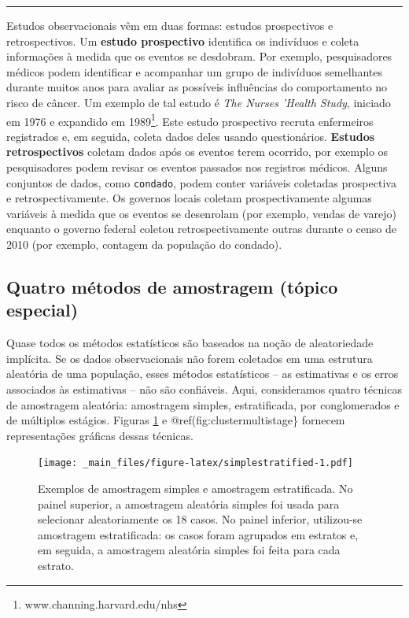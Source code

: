 \documentclass[
]{book}
\theoremstyle{definition}
\theoremstyle{definition}
\theoremstyle{definition}
\theoremstyle{definition}
\theoremstyle{remark}
\begin{document}
\begin{center}\rule{0.5\linewidth}{0.5pt}\end{center}

Estudos observacionais vêm em duas formas: estudos prospectivos e retrospectivos. Um \textbf{estudo prospectivo} identifica os indivíduos e coleta informações à medida que os eventos se desdobram. Por exemplo, pesquisadores médicos podem identificar e acompanhar um grupo de indivíduos semelhantes durante muitos anos para avaliar as possíveis influências do comportamento no risco de câncer. Um exemplo de tal estudo é \emph{The Nurses 'Health Study}, iniciado em 1976 e expandido em 1989\footnote{www.channing.harvard.edu/nhs}. Este estudo prospectivo recruta enfermeiros registrados e, em seguida, coleta dados deles usando questionários. \textbf{Estudos retrospectivos} coletam dados após os eventos terem ocorrido, por exemplo os pesquisadores podem revisar os eventos passados nos registros médicos. Alguns conjuntos de dados, como \texttt{condado}, podem conter variáveis coletadas prospectiva e retrospectivamente. Os governos locais coletam prospectivamente algumas variáveis à medida que os eventos se desenrolam (por exemplo, vendas de varejo) enquanto o governo federal coletou retrospectivamente outras durante o censo de 2010 (por exemplo, contagem da população do condado).

\hypertarget{fourSamplingMethods}{%
\subsection{Quatro métodos de amostragem (tópico especial)}\label{fourSamplingMethods}}

Quase todos os métodos estatísticos são baseados na noção de aleatoriedade implícita. Se os dados observacionais não forem coletados em uma estrutura aleatória de uma população, esses métodos estatísticos -- as estimativas e os erros associados às estimativas -- não são confiáveis. Aqui, consideramos quatro técnicas de amostragem aleatória: amostragem simples, estratificada, por conglomerados e de múltiplos estágios. Figuras \ref{fig:simplestratified} e @ref(fig:clustermultistage\} fornecem representações gráficas dessas técnicas.

\begin{figure}
\centering
\texttt{[image: \_main\_files/figure-latex/simplestratified-1.pdf]}
\caption{\label{fig:simplestratified}Exemplos de amostragem simples e amostragem estratificada. No painel superior, a amostragem aleatória simples foi usada para selecionar aleatoriamente os 18 casos. No painel inferior, utilizou-se amostragem estratificada: os casos foram agrupados em estratos e, em seguida, a amostragem aleatória simples foi feita para cada estrato.}
\end{figure}
\end{document}
